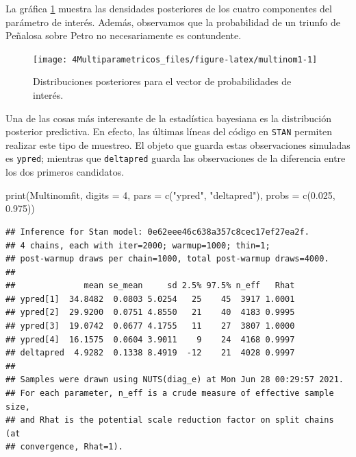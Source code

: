 \documentclass[
  10pt,
  spanish,
]{book}
\newenvironment{Shaded}{\begin{snugshade}}{\end{snugshade}}
\newcommand{\AttributeTok}[1]{\textcolor[rgb]{0.77,0.63,0.00}{#1}}
\newcommand{\DecValTok}[1]{\textcolor[rgb]{0.00,0.00,0.81}{#1}}
\newcommand{\FloatTok}[1]{\textcolor[rgb]{0.00,0.00,0.81}{#1}}
\newcommand{\FunctionTok}[1]{\textcolor[rgb]{0.00,0.00,0.00}{#1}}
\newcommand{\NormalTok}[1]{#1}
\newcommand{\StringTok}[1]{\textcolor[rgb]{0.31,0.60,0.02}{#1}}
\theoremstyle{definition}
\theoremstyle{definition}
\theoremstyle{definition}
\theoremstyle{definition}
\theoremstyle{remark}
\begin{document}
La gráfica \ref{fig:multinom1} muestra las densidades posteriores de los cuatro componentes del parámetro de interés. Además, observamos que la probabilidad de un triunfo de Peñalosa sobre Petro no necesariamente es contundente.

\begin{figure}

{\centering \texttt{[image: 4Multiparametricos\_files/figure-latex/multinom1-1]} 

}

\caption{Distribuciones posteriores para el vector de probabilidades de interés.}\label{fig:multinom1}
\end{figure}

Una de las cosas más interesante de la estadística bayesiana es la distribución posterior predictiva. En efecto, las últimas líneas del código en \texttt{STAN} permiten realizar este tipo de muestreo. El objeto que guarda estas observaciones simuladas es \texttt{ypred}; mientras que \texttt{deltapred} guarda las observaciones de la diferencia entre los dos primeros candidatos.

\begin{Shaded}
\begin{Highlighting}[]
\FunctionTok{print}\NormalTok{(Multinomfit, }\AttributeTok{digits =} \DecValTok{4}\NormalTok{, }
      \AttributeTok{pars =} \FunctionTok{c}\NormalTok{(}\StringTok{"ypred"}\NormalTok{, }\StringTok{"deltapred"}\NormalTok{), }\AttributeTok{probs =} \FunctionTok{c}\NormalTok{(}\FloatTok{0.025}\NormalTok{, }\FloatTok{0.975}\NormalTok{))}
\end{Highlighting}
\end{Shaded}

\begin{verbatim}
## Inference for Stan model: 0e62eee46c638a357c8cec17ef27ea2f.
## 4 chains, each with iter=2000; warmup=1000; thin=1; 
## post-warmup draws per chain=1000, total post-warmup draws=4000.
## 
##              mean se_mean     sd 2.5% 97.5% n_eff   Rhat
## ypred[1]  34.8482  0.0803 5.0254   25    45  3917 1.0001
## ypred[2]  29.9200  0.0751 4.8550   21    40  4183 0.9995
## ypred[3]  19.0742  0.0677 4.1755   11    27  3807 1.0000
## ypred[4]  16.1575  0.0604 3.9011    9    24  4168 0.9997
## deltapred  4.9282  0.1338 8.4919  -12    21  4028 0.9997
## 
## Samples were drawn using NUTS(diag_e) at Mon Jun 28 00:29:57 2021.
## For each parameter, n_eff is a crude measure of effective sample size,
## and Rhat is the potential scale reduction factor on split chains (at 
## convergence, Rhat=1).
\end{verbatim}
\end{document}
